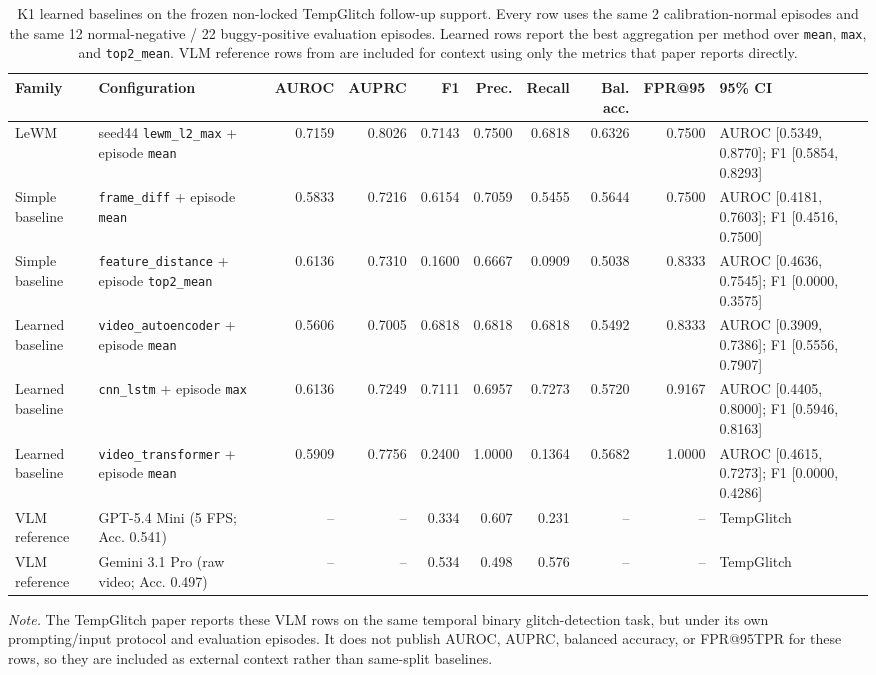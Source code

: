 \begin{table}[t]
\caption{K1 learned baselines on the frozen non-locked TempGlitch follow-up support. Every row
uses the same 2 calibration-normal episodes and the same
12 normal-negative / 22
buggy-positive evaluation episodes. Learned rows report the best aggregation per method over
\texttt{mean}, \texttt{max}, and \texttt{top2\_mean}. VLM reference rows from
\cite{tempglitch} are included for context using only the metrics that paper reports directly.}
\label{tab:k1-learned-baselines}
\centering
\scriptsize
\begin{tabularx}{\textwidth}{@{}lXrrrrrrrX@{}}
\toprule
Family & Configuration & AUROC & AUPRC & F1 & Prec. & Recall & Bal. acc. & FPR@95 & 95\% CI \\
\midrule
LeWM & seed44 \texttt{lewm\_l2\_max} + episode \texttt{mean} & 0.7159 & 0.8026 & 0.7143 & 0.7500 & 0.6818 & 0.6326 & 0.7500 & AUROC [0.5349, 0.8770]; F1 [0.5854, 0.8293] \\
Simple baseline & \texttt{frame\_diff} + episode \texttt{mean} & 0.5833 & 0.7216 & 0.6154 & 0.7059 & 0.5455 & 0.5644 & 0.7500 & AUROC [0.4181, 0.7603]; F1 [0.4516, 0.7500] \\
Simple baseline & \texttt{feature\_distance} + episode \texttt{top2\_mean} & 0.6136 & 0.7310 & 0.1600 & 0.6667 & 0.0909 & 0.5038 & 0.8333 & AUROC [0.4636, 0.7545]; F1 [0.0000, 0.3575] \\
Learned baseline & \texttt{video\_autoencoder} + episode \texttt{mean} & 0.5606 & 0.7005 & 0.6818 & 0.6818 & 0.6818 & 0.5492 & 0.8333 & AUROC [0.3909, 0.7386]; F1 [0.5556, 0.7907] \\
Learned baseline & \texttt{cnn\_lstm} + episode \texttt{max} & 0.6136 & 0.7249 & 0.7111 & 0.6957 & 0.7273 & 0.5720 & 0.9167 & AUROC [0.4405, 0.8000]; F1 [0.5946, 0.8163] \\
Learned baseline & \texttt{video\_transformer} + episode \texttt{mean} & 0.5909 & 0.7756 & 0.2400 & 1.0000 & 0.1364 & 0.5682 & 1.0000 & AUROC [0.4615, 0.7273]; F1 [0.0000, 0.4286] \\
VLM reference & GPT-5.4 Mini (5 FPS; Acc. 0.541) & -- & -- & 0.334 & 0.607 & 0.231 & -- & -- & TempGlitch~\cite{tempglitch} \\
VLM reference & Gemini 3.1 Pro (raw video; Acc. 0.497) & -- & -- & 0.534 & 0.498 & 0.576 & -- & -- & TempGlitch~\cite{tempglitch} \\
\bottomrule
\end{tabularx}
\parbox{\textwidth}{\footnotesize\textit{Note.} The TempGlitch paper reports these VLM rows on
the same temporal binary glitch-detection task, but under its own prompting/input protocol and
evaluation episodes. It does not publish AUROC, AUPRC, balanced accuracy, or FPR@95TPR for these
rows, so they are included as external context rather than same-split baselines.}
\end{table}
